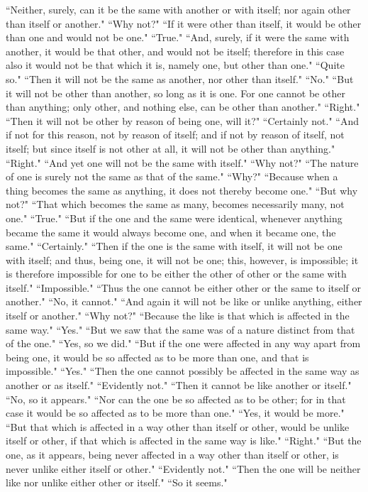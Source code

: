 \documentclass[letterpaper,12pt]{article}
\newcommand{\stephpag}[1]{\marginnote{\small\itshape\fontfamily{ppl}\selectfont #1}}
\begin{document}
``Neither, surely, can it be the same with another or with itself; nor again other than itself or another." ``Why not?" ``If it were other than itself, it would be other than one and would not be one." ``True." ``And, surely, if it were the same with another, it would be that other, and would not be itself; \stephpag{c} therefore in this case also it would not be that which it is, namely one, but other than one." ``Quite so." ``Then it will not be the same as another, nor other than itself." ``No." ``But it will not be other than another, so long as it is one. For one cannot be other than anything; only other, and nothing else, can be other than another." ``Right." ``Then it will not be other by reason of being one, will it?" ``Certainly not." ``And if not for this reason, not by reason of itself; and if not by reason of itself, not itself; but since itself is not other at all, \stephpag{d} it will not be other than anything." ``Right." ``And yet one will not be the same with itself." ``Why not?" ``The nature of one is surely not the same as that of the same." ``Why?" ``Because when a thing becomes the same as anything, it does not thereby become one." ``But why not?" ``That which becomes the same as many, becomes necessarily many, not one." ``True." ``But if the one and the same were identical, whenever anything became the same it would always become one, and when it became one, the same." ``Certainly." ``Then if the one is the same with itself, \stephpag{e} it will not be one with itself; and thus, being one, it will not be one; this, however, is impossible; it is therefore impossible for one to be either the other of other or the same with itself." ``Impossible." ``Thus the one cannot be either other or the same to itself or another." ``No, it cannot." ``And again it will not be like or unlike anything, either itself or another." ``Why not?" ``Because the like is that which is affected in the same way." ``Yes." ``But we saw that the same was of a nature distinct from that of the one." ``Yes, so we did." \stephpag{140 a} ``But if the one were affected in any way apart from being one, it would be so affected as to be more than one, and that is impossible." ``Yes." ``Then the one cannot possibly be affected in the same way as another or as itself." ``Evidently not." ``Then it cannot be like another or itself." ``No, so it appears." ``Nor can the one be so affected as to be other; for in that case it would be so affected as to be more than one." ``Yes, it would be more." ``But that which is affected in a way other than itself or other, \stephpag{b} would be unlike itself or other, if that which is affected in the same way is like." ``Right." ``But the one, as it appears, being never affected in a way other than itself or other, is never unlike either itself or other." ``Evidently not." ``Then the one will be neither like nor unlike either other or itself." ``So it seems."
\end{document}
